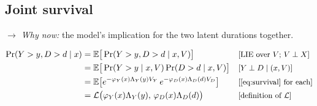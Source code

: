 \documentclass[11pt]{article}
\newcommand{\E}{\mathbb{E}}
\newcommand{\1}{\mathbf{1}}
\newcommand{\Lap}{\mathcal{L}}
\newcommand{\why}[1]{\text{\small[#1]}}
\newcommand{\whynow}[1]{\par\noindent\textit{$\rightarrow$ Why now:} #1\par}
\begin{document}
\subsection{Joint survival}
\whynow{the model's implication for the two latent durations together.}
\begin{align}
  \Pr(Y>y,D>d\mid x) &= \E\big[\Pr(Y>y,D>d\mid x,V)\big] && \why{LIE over $V$; $V\perp X$} \nonumber\\
  &= \E\big[\Pr(Y>y\mid x,V)\Pr(D>d\mid x,V)\big] && \why{$Y\perp D\mid(x,V)$} \nonumber\\
  &= \E\big[e^{-\varphi_Y(x)\Lambda_Y(y)V_Y}\,e^{-\varphi_D(x)\Lambda_D(d)V_D}\big] && \why{\eqref{eq:survival} for each} \nonumber\\
  &= \Lap\big(\varphi_Y(x)\Lambda_Y(y),\,\varphi_D(x)\Lambda_D(d)\big) && \why{definition of $\Lap$} \label{eq:jointsurv}
\end{align}
\end{document}
